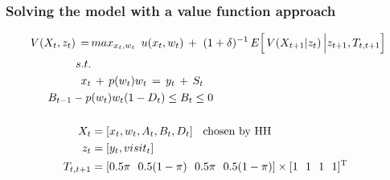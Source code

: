 \documentclass[aspectratio=149]{beamer}
\begin{document}
\begin{frame}
\frametitle{Solving the model with a value function approach}

\begin{align*}
V(X_t,z_t) \,=\, &max_{x_t,w_t}  \,\,\, u(x_t,w_t) \,+\,\, (1+\delta)^{-1} \, E \Big[\, V(X_{t+1}|z_{t})\,\Big| z_{t+1}, T_{t,t+1} \Big]
\\
s.t.& \\
x_t & \, + \, p(w_t) w_t \, = \, y_t  \, + \, S_t \\
B_{t-1}-p&(w_t) w_t (1-D_{t}) \leq B_{t} \leq 0  \\
\\
X_t &= [x_{t},w_{t},A_{t},B_{t},D_{t}] \hspace{2mm}\text{ chosen by HH }  \\
 z_t &= [y_t,visit_t]  \\
T_{t,t+1} &= [ 0.5\pi \,\,\,\, 0.5(1-\pi)\,\,\,\,  0.5\pi\,\,\,\,  0.5(1-\pi) ] \times [ 1 \,\,\,\, 1\,\,\,\,  1 \,\,\,\, 1 ]^{\text{T}}
\end{align*}



\end{frame}

\end{document}
